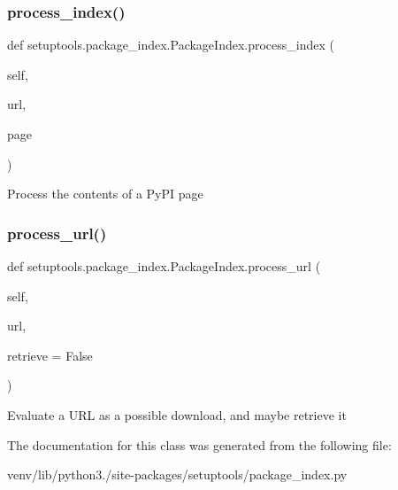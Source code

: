 \subsubsection{\texorpdfstring{process\+\_\+index()}{process\_index()}}
{\footnotesize\ttfamily def setuptools.\+package\+\_\+index.\+Package\+Index.\+process\+\_\+index (\begin{DoxyParamCaption}\item[{}]{self,  }\item[{}]{url,  }\item[{}]{page }\end{DoxyParamCaption})}

\begin{DoxyVerb}Process the contents of a PyPI page\end{DoxyVerb}
 \mbox{\label{classsetuptools_1_1package__index_1_1_package_index_a537fc87df159c2474b7fa0ccac56513d}} 
\subsubsection{\texorpdfstring{process\+\_\+url()}{process\_url()}}
{\footnotesize\ttfamily def setuptools.\+package\+\_\+index.\+Package\+Index.\+process\+\_\+url (\begin{DoxyParamCaption}\item[{}]{self,  }\item[{}]{url,  }\item[{}]{retrieve = {\ttfamily False} }\end{DoxyParamCaption})}

\begin{DoxyVerb}Evaluate a URL as a possible download, and maybe retrieve it\end{DoxyVerb}
 

The documentation for this class was generated from the following file\+:\begin{DoxyCompactItemize}
\item 
venv/lib/python3./site-\/packages/setuptools/package\+\_\+index.\+py\end{DoxyCompactItemize}
